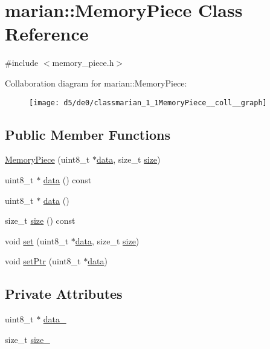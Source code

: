 \hypertarget{classmarian_1_1MemoryPiece}{}\section{marian\+:\+:Memory\+Piece Class Reference}
\label{classmarian_1_1MemoryPiece}


{\ttfamily \#include $<$memory\+\_\+piece.\+h$>$}



Collaboration diagram for marian\+:\+:Memory\+Piece\+:
\nopagebreak
\begin{figure}[H]
\begin{center}
\leavevmode
\texttt{[image: d5/de0/classmarian\_1\_1MemoryPiece\_\_coll\_\_graph]}
\end{center}
\end{figure}
\subsection*{Public Member Functions}
\begin{DoxyCompactItemize}
\item 
\hyperlink{classmarian_1_1MemoryPiece_a5818fa412d174b204a258b112a937e80}{Memory\+Piece} (uint8\+\_\+t $\ast$\hyperlink{classmarian_1_1MemoryPiece_a9ba0f524772deb22d35bb85c8ca454c7}{data}, size\+\_\+t \hyperlink{classmarian_1_1MemoryPiece_a2d4943aea13728e650fc2a2e0f719661}{size})
\item 
uint8\+\_\+t $\ast$ \hyperlink{classmarian_1_1MemoryPiece_a9ba0f524772deb22d35bb85c8ca454c7}{data} () const 
\item 
uint8\+\_\+t $\ast$ \hyperlink{classmarian_1_1MemoryPiece_a461a9514e360280b05c673b636a9a520}{data} ()
\item 
size\+\_\+t \hyperlink{classmarian_1_1MemoryPiece_a2d4943aea13728e650fc2a2e0f719661}{size} () const 
\item 
void \hyperlink{classmarian_1_1MemoryPiece_ad6c2de9229ec366096095f1e0d815a14}{set} (uint8\+\_\+t $\ast$\hyperlink{classmarian_1_1MemoryPiece_a9ba0f524772deb22d35bb85c8ca454c7}{data}, size\+\_\+t \hyperlink{classmarian_1_1MemoryPiece_a2d4943aea13728e650fc2a2e0f719661}{size})
\item 
void \hyperlink{classmarian_1_1MemoryPiece_af604e9210fb8472d86e0a69deaf75280}{set\+Ptr} (uint8\+\_\+t $\ast$\hyperlink{classmarian_1_1MemoryPiece_a9ba0f524772deb22d35bb85c8ca454c7}{data})
\end{DoxyCompactItemize}
\subsection*{Private Attributes}
\begin{DoxyCompactItemize}
\item 
uint8\+\_\+t $\ast$ \hyperlink{classmarian_1_1MemoryPiece_a0188dc58e2d25a29d98fa40d4ebaabe2}{data\+\_\+}
\item 
size\+\_\+t \hyperlink{classmarian_1_1MemoryPiece_ae7822b5a7f733156ccab1a40de674831}{size\+\_\+}
\end{DoxyCompactItemize}
